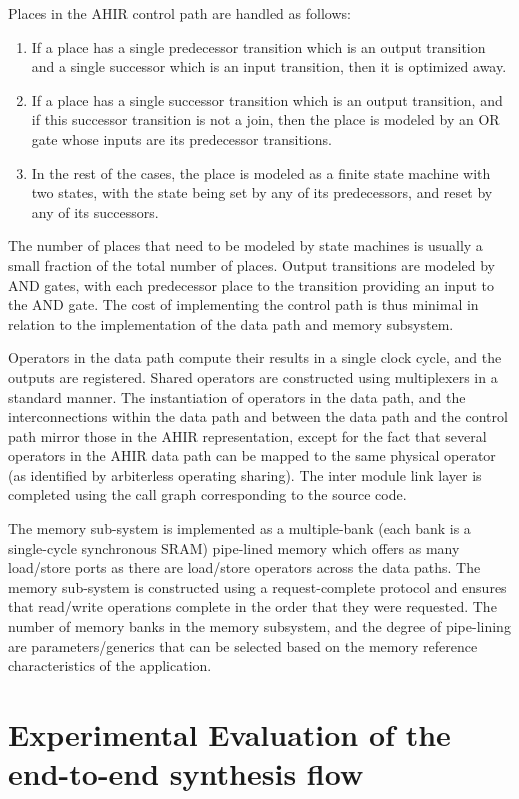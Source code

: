 \documentclass[conference]{IEEEtran}
\begin{document}
Places in the AHIR control path are handled as follows:
\begin{enumerate}
\item If a place has a single predecessor transition which is
an output transition and a single successor which is an input
transition, then it is optimized away.
\item If a place has a single successor transition which is
an output transition, and if this successor transition is
not a join, then the place is modeled by an OR gate whose inputs
are its predecessor transitions.
\item In the rest of the cases, the place is modeled as 
a finite state machine with two states, with the state being
set by any of its predecessors, and reset by any of its successors.
\end{enumerate}
The number of places that need to be modeled by state machines is
usually a small fraction of the total number of places.
Output transitions are modeled by AND gates, with each predecessor place
to the transition providing an input to the AND gate.  The cost
of implementing the control path is thus minimal in relation to
the implementation of the data path and memory subsystem.

Operators in the data path compute their results in a single
clock cycle, and the outputs are registered.  Shared operators
are constructed using multiplexers in a standard manner.
The instantiation of operators in the data path, 
and the interconnections within
the data path and between the data path and the control path
mirror those in the AHIR representation, except for the fact
that several operators in the AHIR data path can be mapped
to the same physical operator (as identified by arbiterless
operating sharing).
The inter module link layer is completed using the call graph
corresponding to the source code.

The memory sub-system is implemented as a multiple-bank (each
bank is a single-cycle synchronous SRAM)
pipe-lined memory which offers as many load/store ports as
there are load/store operators across the data paths.  The memory
sub-system is constructed using a request-complete protocol and
ensures that read/write operations complete in the order
that they were requested. The number of memory banks in the memory
subsystem,
and the degree of pipe-lining are parameters/generics that
can be selected based on the memory reference characteristics
of the application.

\section{Experimental Evaluation of the end-to-end synthesis flow}
\end{document}
